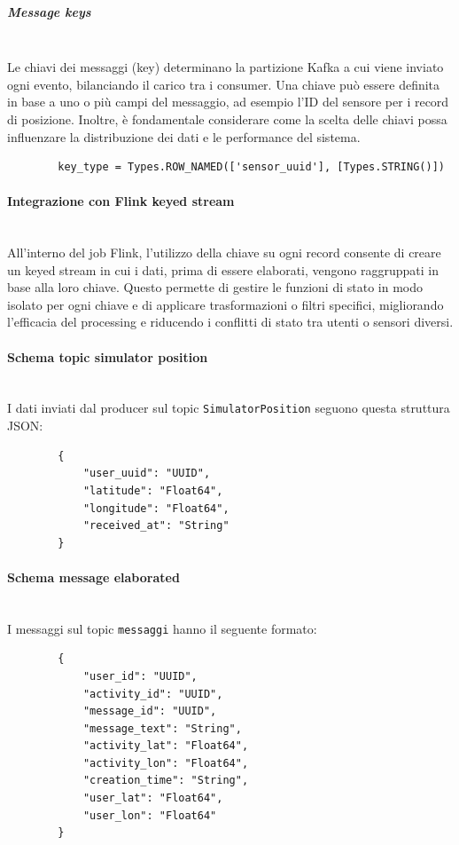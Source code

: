 \documentclass[10pt]{article}
\newcommand{\myparagraph}[1]{\paragraph{#1}\mbox{}\\}
\newcommand{\mysubparagraph}[1]{\subparagraph{#1}\mbox{}\\}
\begin{document}
        \mysubparagraph{Message keys}
        Le chiavi dei messaggi (key) determinano la partizione Kafka a cui viene inviato ogni evento, bilanciando il carico tra i consumer. Una chiave può essere definita in base a uno o più campi del messaggio, ad esempio l'ID del sensore per i record di posizione. Inoltre, è fondamentale considerare come la scelta delle chiavi possa influenzare la distribuzione dei dati e le performance del sistema.
        \begin{lstlisting}
        key_type = Types.ROW_NAMED(['sensor_uuid'], [Types.STRING()])
        \end{lstlisting}

        \myparagraph{Integrazione con Flink keyed stream}
        All’interno del job Flink, l'utilizzo della chiave su ogni record consente di creare un keyed stream
        in cui i dati, prima di essere elaborati, vengono raggruppati in base alla loro chiave. Questo permette
        di gestire le funzioni di stato in modo isolato per ogni chiave e di applicare trasformazioni o filtri
        specifici, migliorando l’efficacia del processing e riducendo i conflitti di stato tra utenti o sensori
        diversi.

        \myparagraph{Schema topic simulator position}
        I dati inviati dal producer sul topic \texttt{SimulatorPosition} seguono questa struttura JSON: \\
        \begin{lstlisting}
        {
            "user_uuid": "UUID",
            "latitude": "Float64",
            "longitude": "Float64",
            "received_at": "String"
        }
        \end{lstlisting}

        \myparagraph{Schema message elaborated}
        I messaggi sul topic \texttt{messaggi} hanno il seguente formato: \\
        \begin{lstlisting}
        {
            "user_id": "UUID",
            "activity_id": "UUID",
            "message_id": "UUID",
            "message_text": "String",
            "activity_lat": "Float64",
            "activity_lon": "Float64",
            "creation_time": "String",
            "user_lat": "Float64",
            "user_lon": "Float64"
        }
        \end{lstlisting}
\end{document}
